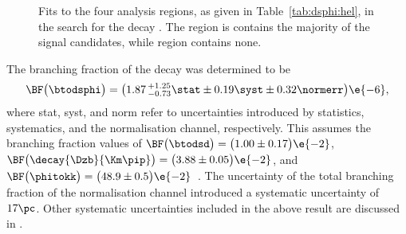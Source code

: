 \begin{figure}
  \begin{center}
    \caption[Fits to \btodsphi data]
    {
      Fits to the four analysis regions, as given in Table~\ref{tab:dsphi:hel}, in the search for
      the decay \btodsphi.
      The region \rA is contains the majority of the signal candidates, while region \rD contains
      none.
    }
    \label{fig:dsphi:fits}
  \end{center}
\end{figure}

The branching fraction of the decay \btodsphi was determined to be
\begin{equation}
  \BF\big(\btodsphi\big) =
  \big(1.87\,^{+1.25}_{-0.73}\stat\pm0.19\syst\pm0.32\normerr\big)\e{-6},
  \label{eq:dsphi:result}
\end{equation}
where stat, syst, and norm refer to uncertainties introduced by statistics, systematics, and the
normalisation channel, respectively.
This assumes the branching fraction values of
$\BF\big(\btodsd\big)=\big(1.00\pm0.17\big)\e{-2}$,
$\BF\big(\decay{\Dzb}{\Km\pip}\big)=\big(3.88\pm0.05\big)\e{-2}$, and
$\BF\big(\phitokk\big)=\big(48.9\pm0.5\big)\e{-2}$~\cite{PDG2012}.
The uncertainty of the total branching fraction of the normalisation channel introduced a systematic
uncertainty of $17\pc$.
Other systematic uncertainties included in the above result are discussed in
.






